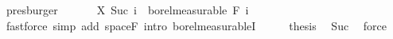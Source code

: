 \begin{isabellebody}
\ presburger\isanewline
\ \ \isacommand{{\isacharbraceright}{\kern0pt}}\isamarkupfalse%
\isanewline
\ \ \isamarkupfalse%
\ {\isachardoublequoteopen}X\ {\isacharparenleft}{\kern0pt}Suc\ i{\isacharparenright}{\kern0pt}\ {\isasymin}\ borel{\isacharunderscore}{\kern0pt}measurable\ {\isacharparenleft}{\kern0pt}F\ i{\isacharparenright}{\kern0pt}{\isachardoublequoteclose}\ \isamarkupfalse%
\ {\isacharparenleft}{\kern0pt}fastforce\ simp\ add{\isacharcolon}{\kern0pt}\ space{\isacharunderscore}{\kern0pt}F\ intro{\isacharbang}{\kern0pt}{\isacharcolon}{\kern0pt}\ borel{\isacharunderscore}{\kern0pt}measurableI{\isacharparenright}{\kern0pt}\isanewline
\ \ \isamarkupfalse%
\ \isamarkupfalse%
\ {\isacharquery}{\kern0pt}thesis\ \isamarkupfalse%
\ Suc\ \isamarkupfalse%
\ force\isanewline
{}\isamarkupfalse%
%
\endisatagproof
{\isafoldproof}%
%
\isadelimproof
\isanewline
%
\endisadelimproof
\isanewline
{}\isamarkupfalse%
\isanewline
%
\isadelimtheory
\isanewline
%
\endisadelimtheory
%
\isatagtheory
{}\isamarkupfalse%
%
\endisatagtheory
{\isafoldtheory}%
%
\isadelimtheory
%
\endisadelimtheory
%
\end{isabellebody}%
\endinput
